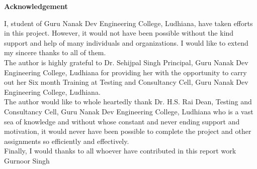 \begin{center}
{\Huge \bf{Acknowledgement}\vskip 0.2in}
\end{center}

\noindent I, student of Guru Nanak Dev Engineering College, Ludhiana, have taken efforts in this project.
However, it would not have been possible without the kind support and help of many individuals
and organizations. I would like to extend my sincere thanks to all of them.\\

\noindent The author is highly grateful to Dr. Sehijpal Singh Principal, Guru Nanak Dev Engineering College, Ludhiana for providing her with the opportunity to carry out her Six month Training at
Testing and Consultancy Cell, Guru Nanak Dev Engineering College, Ludhiana.\\



\noindent The author would like to whole heartedly thank Dr. H.S. Rai Dean, Testing and Consultancy
Cell, Guru Nanak Dev Engineering College, Ludhiana who is a vast sea of knowledge and without whose constant and never ending support and motivation, it would never have been possible to complete the project and other assignments so efficiently and effectively.\\

\noindent Finally, I would thanks to all whoever have contributed in this report work\\


\vskip 1.0cm 
\noindent Gurnoor Singh



